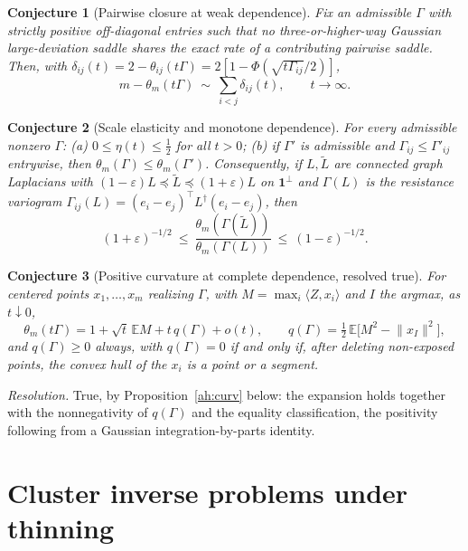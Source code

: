 \documentclass[11pt]{article}
\newtheorem{conjecture}{Conjecture}
\theoremstyle{definition}
\newcommand{\E}{\mathbb E}
\newcommand{\eps}{\varepsilon}
\providecommand{\E}{\mathbb E}
\begin{document}
\begin{conjecture}[Pairwise closure at weak dependence]\label{ah2}
Fix an admissible $\Gamma$ with strictly positive off-diagonal entries such that no three-or-higher-way Gaussian large-deviation saddle shares the exact rate of a contributing pairwise saddle.  Then, with $\delta_{ij}(t)=2-\theta_{ij}(t\Gamma)=2[1-\Phi(\sqrt{t\Gamma_{ij}}/2)]$,
\[
m-\theta_m(t\Gamma)\ \sim\ \sum_{i<j}\delta_{ij}(t),\qquad t\to\infty.
\]
\end{conjecture}

\begin{conjecture}[Scale elasticity and monotone dependence]\label{ah3}
For every admissible nonzero $\Gamma$: (a) $0\le\eta(t)\le\tfrac12$ for all $t>0$; (b) if $\Gamma'$ is admissible and $\Gamma_{ij}\le\Gamma'_{ij}$ entrywise, then $\theta_m(\Gamma)\le\theta_m(\Gamma')$.  Consequently, if $L,\widetilde L$ are connected graph Laplacians with $(1-\eps)L\preceq\widetilde L\preceq(1+\eps)L$ on $\mathbf 1^\perp$ and $\Gamma(L)$ is the resistance variogram $\Gamma_{ij}(L)=(e_i-e_j)^\top L^\dagger(e_i-e_j)$, then
\[
(1+\eps)^{-1/2}\ \le\ \frac{\theta_m(\Gamma(\widetilde L))}{\theta_m(\Gamma(L))}\ \le\ (1-\eps)^{-1/2}.
\]
\end{conjecture}

\begin{conjecture}[Positive curvature at complete dependence, resolved true]\label{ah4}
For centered points $x_1,\ldots,x_m$ realizing $\Gamma$, with $M=\max_i\langle Z,x_i\rangle$ and $I$ the argmax, as $t\downarrow0$,
\[
\theta_m(t\Gamma)=1+\sqrt t\,\E M+t\,q(\Gamma)+o(t),\qquad q(\Gamma)=\tfrac12\,\E\bigl[M^2-\lVert x_I\rVert^2\bigr],
\]
and $q(\Gamma)\ge0$ always, with $q(\Gamma)=0$ if and only if, after deleting non-exposed points, the convex hull of the $x_i$ is a point or a segment.
\end{conjecture}

\emph{Resolution.} True, by Proposition~\ref{ah:curv} below: the expansion holds together with the nonnegativity of $q(\Gamma)$ and the equality classification, the positivity following from a Gaussian integration-by-parts identity.

\section{Cluster inverse problems under thinning}
\end{document}
